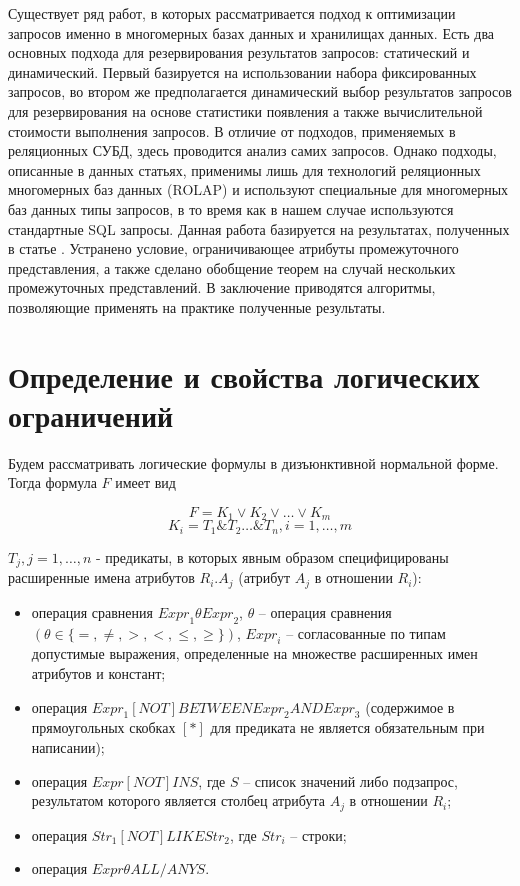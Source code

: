 \documentclass[10pt,a4paper]{article}
\def \n #1{\mathit{#1}}
\begin{document}
Существует ряд работ, в которых рассматривается подход к оптимизации запросов
именно в многомерных базах данных и хранилищах данных.
Есть два основных подхода для резервирования результатов запросов: статический
\cite{baralis, gupta, gupta-mumick} и динамический\cite{scheuermann, shim,
kalnis, chang}. Первый базируется на использовании набора фиксированных
запросов, во втором же предполагается динамический выбор результатов запросов
для резервирования на основе статистики появления а также вычислительной
стоимости выполнения запросов. В отличие от подходов, применяемых в реляционных
СУБД, здесь проводится анализ самих запросов. Однако подходы, описанные в
данных статьях, применимы лишь для технологий реляционных многомерных баз данных
(ROLAP) и используют специальные для многомерных баз данных типы запросов, в то
время как в нашем случае используются стандартные SQL запросы. Данная работа
базируется на результатах, полученных в статье \cite{zyk_pol}. Устранено
условие, ограничивающее атрибуты промежуточного представления, а также сделано
обобщение теорем на случай нескольких промежуточных представлений. В заключение
приводятся алгоритмы, позволяющие применять на практике полученные результаты.

\section{Определение и свойства логических ограничений}

Будем рассматривать логические формулы в дизъюнктивной нормальной форме. Тогда
формула $F$ имеет вид 

\begin{equation}
F = K_1 \vee K_2 \vee \dots \vee K_m
\label{def_F_1}
\end{equation}
\begin{equation}
K_i = T_1 \& T_2 \dots \& T_n, i = 1, \dots, m
\label{def_F_2}
\end{equation}

$T_j, j = 1, \dots, n$ - предикаты, в которых явным образом
специфицированы расширенные имена атрибутов $R_i.A_j$ (атрибут $A_j$ в отношении
$R_i$):
\begin{itemize}
  \item	операция сравнения $ \n{Expr}_1 \theta \n{Expr}_2$, $\theta$ – операция
  сравнения $(\theta \in \{=, \neq, >, <, \leq, \geq\})$, $\n{Expr}_i$ –
  согласованные по типам допустимые выражения, определенные на множестве
  расширенных имен атрибутов и констант;
  \item операция $\n{Expr}_1 \n{[NOT]} \n{BETWEEN} \n{Expr}_2 \n{AND}
  \n{Expr}_3$ (содержимое в прямоугольных скобках $[*]$ для предиката не
  является обязательным при написании);
  \item операция $\n{Expr} \n{[NOT]} \n{IN} S$, где $S$ – список значений либо
  подзапрос, результатом которого является столбец атрибута $A_j$ в отношении
  $R_i$;
  \item операция $\n{Str}_1 \n{[NOT]} \n{LIKE} \n{Str}_2$, где $\n{Str}_i$ –
  строки;
  \item операция $\n{Expr} \theta \n{ALL/ANY} S$.
\end{itemize}
\end{document}
